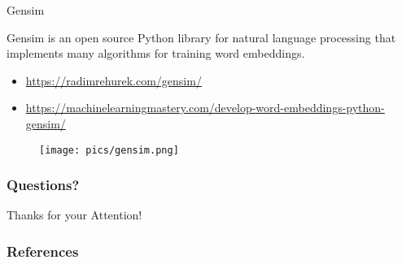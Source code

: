 \documentclass[handout]{beamer}
\begin{document}
\begin{frame}{Gensim}
\begin{scriptsize}
Gensim is an open source Python library for natural language processing that implements many algorithms for training word embeddings.


\begin{itemize}
 \item \url{https://radimrehurek.com/gensim/}

  \item \url{https://machinelearningmastery.com/develop-word-embeddings-python-gensim/}
 
\end{itemize}



  \begin{figure}[h]
        	\texttt{[image: pics/gensim.png]}
        \end{figure}



\end{scriptsize}
\end{frame}







\begin{frame}
\frametitle{Questions?}
\begin{center}\LARGE Thanks for your Attention!\\ \end{center}



\end{frame}

\begin{frame}[allowframebreaks]\scriptsize
\frametitle{References}


%
\end{frame}  


\end{document}
